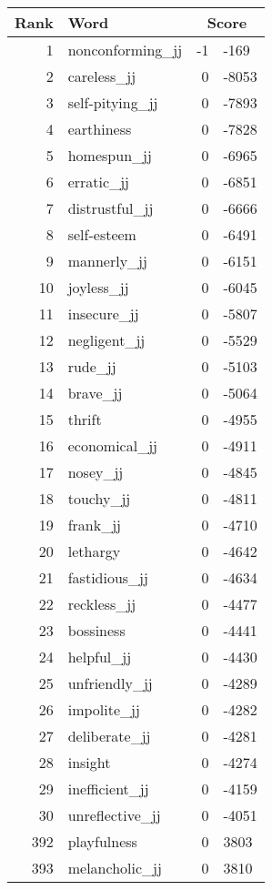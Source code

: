 \begin{longtable}[!htbp]{| rlr@{.}l |}
    \hline
    \textbf{Rank} & \textbf{Word} & \multicolumn{2}{c|}{\textbf{Score}} \\
    \hline
    \endhead
    1 & nonconforming\_jj & -1 & -169 \\
    2 & careless\_jj & 0 & -8053 \\
    3 & self-pitying\_jj & 0 & -7893 \\
    4 & earthiness & 0 & -7828 \\
    5 & homespun\_jj & 0 & -6965 \\
    6 & erratic\_jj & 0 & -6851 \\
    7 & distrustful\_jj & 0 & -6666 \\
    8 & self-esteem & 0 & -6491 \\
    9 & mannerly\_jj & 0 & -6151 \\
    10 & joyless\_jj & 0 & -6045 \\
    11 & insecure\_jj & 0 & -5807 \\
    12 & negligent\_jj & 0 & -5529 \\
    13 & rude\_jj & 0 & -5103 \\
    14 & brave\_jj & 0 & -5064 \\
    15 & thrift & 0 & -4955 \\
    16 & economical\_jj & 0 & -4911 \\
    17 & nosey\_jj & 0 & -4845 \\
    18 & touchy\_jj & 0 & -4811 \\
    19 & frank\_jj & 0 & -4710 \\
    20 & lethargy & 0 & -4642 \\
    21 & fastidious\_jj & 0 & -4634 \\
    22 & reckless\_jj & 0 & -4477 \\
    23 & bossiness & 0 & -4441 \\
    24 & helpful\_jj & 0 & -4430 \\
    25 & unfriendly\_jj & 0 & -4289 \\
    26 & impolite\_jj & 0 & -4282 \\
    27 & deliberate\_jj & 0 & -4281 \\
    28 & insight & 0 & -4274 \\
    29 & inefficient\_jj & 0 & -4159 \\
    30 & unreflective\_jj & 0 & -4051 \\
    392 & playfulness & 0 & 3803 \\
    393 & melancholic\_jj & 0 & 3810 \\

\end{longtable}
